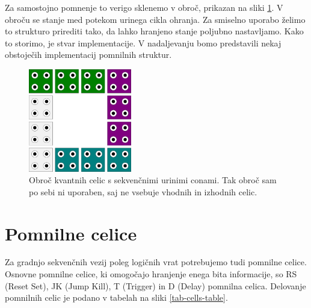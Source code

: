 \documentclass[a4paper, 11pt]{article}
\begin{document}
Za samostojno pomnenje to verigo sklenemo v obroč, prikazan na sliki \ref{img-pregled-seq-circ}.
V obroču se stanje med potekom urinega cikla ohranja.
Za smiselno uporabo želimo to strukturo prirediti tako, da lahko hranjeno stanje poljubno nastavljamo.
Kako to storimo, je stvar implementacije.
V nadaljevanju bomo predstavili nekaj obstoječih implementacij pomnilnih struktur.

\begin{figure}[h]
	\centering
	\includegraphics[width=0.40\textwidth]{../img/pregled/seq_circ.pdf}
	\caption{Obroč kvantnih celic s sekvenčnimi urinimi conami. Tak obroč sam po sebi ni uporaben, saj ne vsebuje vhodnih in izhodnih celic.}
	\label{img-pregled-seq-circ}
\end{figure}



\section{Pomnilne celice}
Za gradnjo sekvenčnih vezij poleg logičnih vrat potrebujemo tudi pomnilne celice.
Osnovne pomnilne celice, ki omogočajo hranjenje enega bita informacije, so RS (Reset Set), JK (Jump Kill), T (Trigger) in D (Delay) pomnilna celica.
Delovanje pomnilnih celic je podano v tabelah na sliki \ref{tab-cells-table}.
\end{document}
